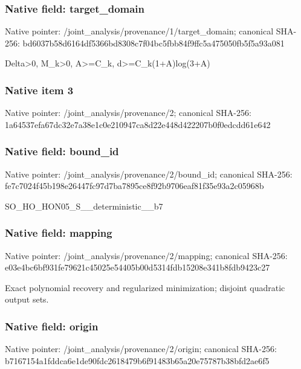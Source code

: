 \documentclass[10pt,a4paper]{article}
\begin{document}
\subsubsection{Native field: target\_\allowbreak{}domain}
Native pointer: /joint\_\allowbreak{}analysis/provenance/1/target\_\allowbreak{}domain; canonical SHA-256: bd6037b58d6164df5366bd8308c7f04bc5fbb84f9ffc5a475050fb5f5a93a081

\begingroup\raggedright\sloppy Delta>0,\allowbreak{} M\_\allowbreak{}k>0,\allowbreak{} A>=\allowbreak{}C\_\allowbreak{}k,\allowbreak{} d>=\allowbreak{}C\_\allowbreak{}k(1+A)log(3+A)\par\endgroup

\subsubsection{Native item 3}
Native pointer: /joint\_\allowbreak{}analysis/provenance/2; canonical SHA-256: 1a64537efa67dc32e7a38e1c0e210947ca8d22e448d422207b0f0edcdd61e642

\subsubsection{Native field: bound\_\allowbreak{}id}
Native pointer: /joint\_\allowbreak{}analysis/provenance/2/bound\_\allowbreak{}id; canonical SHA-256: fe7c7024f45b198e26447fc97d7ba7895ce8f92b9706eaf81f35e93a2c05968b

\begingroup\raggedright\sloppy SO\_\allowbreak{}HO\_\allowbreak{}HON05\_\allowbreak{}S\_\allowbreak{}\_\allowbreak{}deterministic\_\allowbreak{}\_\allowbreak{}b7\par\endgroup

\subsubsection{Native field: mapping}
Native pointer: /joint\_\allowbreak{}analysis/provenance/2/mapping; canonical SHA-256: e03e4bc6bf931fe79621c45025e54405b00d5314fdb15208e341b8fdb9423c27

\begingroup\raggedright\sloppy Exact polynomial recovery and regularized minimization;\allowbreak{} disjoint quadratic output sets.\par\endgroup

\subsubsection{Native field: origin}
Native pointer: /joint\_\allowbreak{}analysis/provenance/2/origin; canonical SHA-256: b7167154a1fddca6e1de90fdc2618479b6f91483b65a20e75787b38bfd2ae6f5
\end{document}
